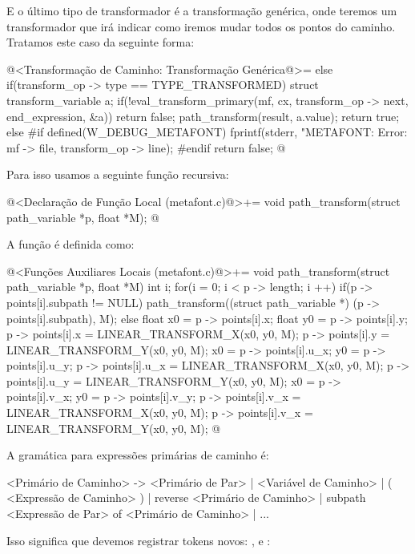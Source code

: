 {E o último tipo de transformador é a transformação genérica, onde
teremos um transformador que irá indicar como iremos mudar todos os
pontos do caminho. Tratamos este caso da seguinte forma:

\iniciocodigo
@<Transformação de Caminho: Transformação Genérica@>=
else if(transform_op -> type == TYPE_TRANSFORMED){
  struct transform_variable a;
  if(!eval_transform_primary(mf, cx, transform_op -> next, end_expression, &a))
    return false;
  path_transform(result, a.value);
  return true;
}
else{
#if defined(W_DEBUG_METAFONT)
  fprintf(stderr, "METAFONT: Error: %
          mf -> file, transform_op -> line);
#endif
  return false;
}
@
\fimcodigo

Para isso usamos a seguinte função recursiva:

\iniciocodigo
@<Declaração de Função Local (metafont.c)@>+=
void path_transform(struct path_variable *p, float *M);
@
\fimcodigo

A função é definida como:

\iniciocodigo
@<Funções Auxiliares Locais (metafont.c)@>+=
void path_transform(struct path_variable *p, float *M){
  int i;
  for(i = 0; i < p -> length; i ++){
    if(p -> points[i].subpath != NULL)
      path_transform((struct path_variable *) (p -> points[i].subpath), M);
    else{
      float x0 = p -> points[i].x;
      float y0 = p -> points[i].y;
      p -> points[i].x = LINEAR_TRANSFORM_X(x0, y0, M);
      p -> points[i].y = LINEAR_TRANSFORM_Y(x0, y0, M);
      x0 = p -> points[i].u_x;
      y0 = p -> points[i].u_y;
      p -> points[i].u_x = LINEAR_TRANSFORM_X(x0, y0, M);
      p -> points[i].u_y = LINEAR_TRANSFORM_Y(x0, y0, M);
      x0 = p -> points[i].v_x;
      y0 = p -> points[i].v_y;
      p -> points[i].v_x = LINEAR_TRANSFORM_X(x0, y0, M);
      p -> points[i].v_x = LINEAR_TRANSFORM_Y(x0, y0, M);
    }
  }
}
@
\fimcodigo



A gramática para expressões primárias de caminho é:

\alinhaverbatim
<Primário de Caminho> -> <Primário de Par> | <Variável de Caminho> |
                       ( <Expressão de Caminho> ) |
                       reverse <Primário de Caminho> |
                       subpath <Expressão de Par> of <Primário de Caminho> |
                       ...
\alinhanormal

Isso significa que devemos registrar tokens
novos: ,  e :

}
